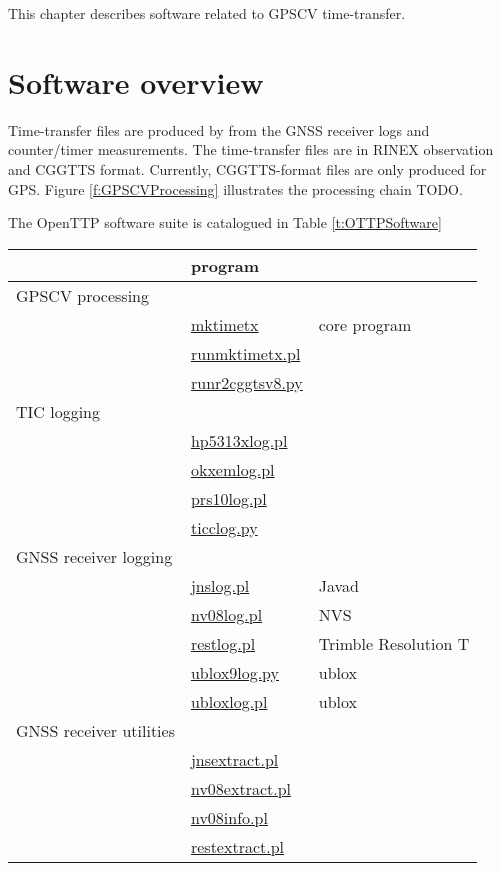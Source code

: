 
This chapter describes software related to GPSCV time-transfer.


\section{Software overview}

Time-transfer files are produced by  from the GNSS receiver logs and counter/timer measurements.
The time-transfer files are in  RINEX observation  and CGGTTS format. 
Currently, CGGTTS-format files are only produced for GPS. 
Figure \ref{f:GPSCVProcessing} illustrates the processing chain TODO. 

The OpenTTP software suite is catalogued in Table \ref{t:OTTPSoftware}
\begin{table}
\begin{tabular}{l|l|l}
	& program & \\ 
	\hline
GPSCV processing  &  & \\
	& \hyperlink{h:mktimetx}{mktimetx} & core program\\
	& \hyperlink{h:runmktimetx}{runmktimetx.pl} & \\
	& \hyperlink{h:runr2cggttsv8}{runr2cggtsv8.py} & \\
	\hline
TIC logging & & \\
	& \hyperlink{h:hp5313xlog}{hp5313xlog.pl} &\\
	& \hyperlink{h:okxemlog}{okxemlog.pl} & \\
	& \hyperlink{h:prs10log}{prs10log.pl} & \\
	& \hyperlink{h:ticclog}{ticclog.py} & \\
	\hline
GNSS receiver logging & & \\
	&	\hyperlink{h:jnslog}{jnslog.pl} & Javad\\
	& \hyperlink{h:nvslog}{nv08log.pl} & NVS\\
	& \hyperlink{h:restlog}{restlog.pl} & Trimble Resolution T\\
	& \hyperlink{h:ublox9log}{ublox9log.py} & ublox\\
	& \hyperlink{h:ubloxlog}{ubloxlog.pl} & ublox\\
GNSS receiver utilities & & \\
	& \hyperlink{h:jnsextract}{jnsextract.pl} & \\
	& \hyperlink{h:nv08extract}{nv08extract.pl} & \\
	& \hyperlink{h:nv08info}{nv08info.pl} & \\
	& \hyperlink{h:restextract}{restextract.pl} & \\

\end{tabular}
\end{table}
